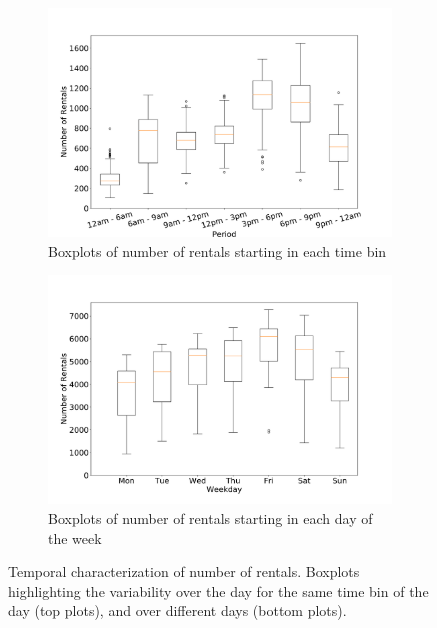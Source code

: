 \begin{figure}
    \begin{center}
        \begin{subfigure}{0.65\columnwidth}
            \includegraphics[width=\columnwidth]{figures/temporal_characterization/AverageBookingsPeriod.pdf}
             \caption{Boxplots of number of rentals starting in each time bin
             \vspace{0.5cm}}
             \label{fig:8_3_rentals-per-period}
        \end{subfigure}
        \begin{subfigure}{0.65\columnwidth}
            \includegraphics[width=\columnwidth]{figures/temporal_characterization/AverageBookingsWeekday.pdf}
             \caption{Boxplots of number of rentals starting in each day of the week}
             \label{fig:8_3_rentals-per-weekday}
        \end{subfigure}
        \caption{Temporal characterization of number of rentals. Boxplots highlighting the variability over the day for the same time bin of the day (top plots), and over different days (bottom plots).}
    \end{center}
\end{figure}


